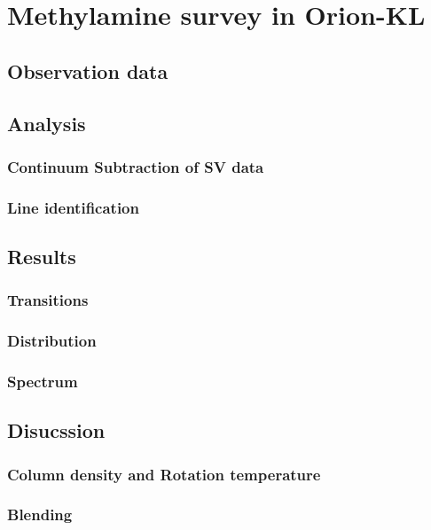 \chapter{Methylamine survey in Orion-KL
\label{chap:Orion-KL}}

\section{Observation data}

\section{Analysis}
\subsection{Continuum Subtraction of SV data}
\subsection{Line identification}

\section{Results}
\subsection{Transitions}
\subsection{Distribution}
\subsection{Spectrum}

\section{Disucssion}
\subsection{Column density and Rotation temperature}
\subsection{Blending}